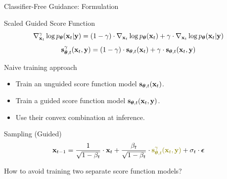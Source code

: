 \documentclass{beamer}
\begin{document}
\begin{frame}{Classifier-Free Guidance: Formulation}
	\begin{block}{Scaled Guided Score Function}
		\vspace{-0.5cm}
		\[
			\nabla_{\mathbf{x}_t}^{\gamma} \log p_{\boldsymbol{\theta}}(\mathbf{x}_t | \mathbf{y}) =  (1 - \gamma) \cdot  \nabla_{\mathbf{x}_t} \log p_{\boldsymbol{\theta}}(\mathbf{x}_t) + \gamma \cdot  \nabla_{\mathbf{x}_t} \log p_{\boldsymbol{\theta}}(\mathbf{x}_t| \mathbf{y})
		\]
		\vspace{-0.5cm}
		\eqpause
		\[
			\mathbf{s}^{\gamma}_{\boldsymbol{\theta}, t}(\mathbf{x}_t, \mathbf{y}) = (1 - \gamma) \cdot \mathbf{s}_{\boldsymbol{\theta}, t}(\mathbf{x}_t) +  \gamma \cdot \mathbf{s}_{\boldsymbol{\theta}, t}(\mathbf{x}_t, \mathbf{y})
		\]
		\vspace{-0.5cm}
	\end{block}
	\eqpause
	\begin{block}{Naive training approach}
		\begin{itemize}
			\item Train an unguided score function model $\mathbf{s}_{\boldsymbol{\theta}, t}(\mathbf{x}_t)$.
			\item Train a guided score function model $\mathbf{s}_{\boldsymbol{\theta}, t}(\mathbf{x}_t, \mathbf{y})$.
			\eqpause
			\item Use their convex combination at inference.
		\end{itemize}
	\end{block}
	\begin{block}{Sampling (Guided)}
		\vspace{-0.3cm}
		\[
			\bx_{t-1} = \frac{1}{\sqrt{1 - \beta_t}} \cdot \bx_t + \frac{\beta_t}{\sqrt{1 - \beta_t}} \cdot  {\color{olive}\bs^{\gamma}_{\btheta, t}(\bx_t, \by)} + \sigma_t \cdot \bepsilon
		\]
		\vspace{-0.3cm}
	\end{block}
	\eqpause
	How to avoid training two separate score function models?
\end{frame}
\end{document}
